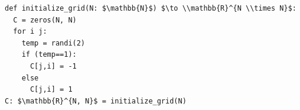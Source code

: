 \documentclass[border=10pt]{standalone}
\begin{document}
\begin{lstlisting}
def initialize_grid(N: $\mathbb{N}$) $\to \\mathbb{R}^{N \\times N}$:
  C = zeros(N, N)
  for i j:
    temp = randi(2)
    if (temp==1):
      C[j,i] = -1
    else 
      C[j,i] = 1
C: $\mathbb{R}^{N, N}$ = initialize_grid(N)
\end{lstlisting}
\end{document}
